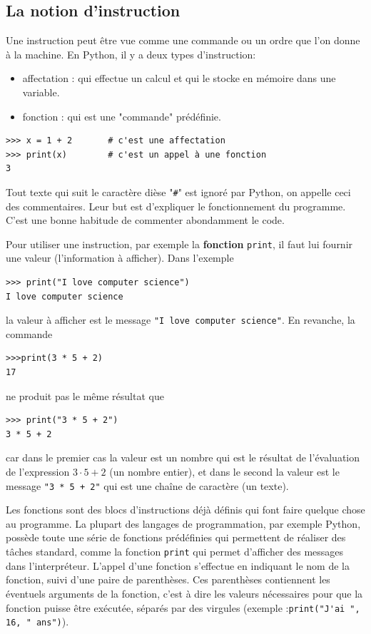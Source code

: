 \documentclass[11pt, a4paper]{book}
\begin{document}
\subsection{La notion d'instruction}
Une instruction peut être vue comme une commande ou un ordre que l'on donne à la machine. En Python, il y a deux types d’instruction:
\begin{itemize}
	\item affectation : qui effectue un calcul et qui le stocke en mémoire dans une variable.
	\item fonction    : qui est une "commande" prédéfinie. 
\end{itemize}
\begin{myexample}
	\vspace{-3mm}
	\begin{lstlisting}[numbers=none]
>>> x = 1 + 2       # c'est une affectation
>>> print(x)        # c'est un appel à une fonction
3
	\end{lstlisting}
	\vspace{-3mm}
\end{myexample}


\begin{eclairage}
	Tout texte qui suit le caractère dièse "\lstinline{#}" est ignoré par Python, on appelle ceci des commentaires. Leur but est d’expliquer le fonctionnement du programme. C’est une bonne habitude de commenter abondamment le code.
\end{eclairage}
Pour utiliser une instruction, par exemple la \textbf{fonction} \lstinline{print}, il faut lui fournir une valeur (l'information à afficher). Dans l'exemple
\begin{lstlisting}[numbers=none]
>>> print("I love computer science")
I love computer science
\end{lstlisting}
la valeur à afficher est le message \lstinline{"I love computer science"}. En revanche, la commande 
\begin{lstlisting}[numbers=none]
>>>print(3 * 5 + 2)
17
\end{lstlisting}
ne produit pas le même résultat que 
\begin{lstlisting}[numbers=none]
>>> print("3 * 5 + 2")
3 * 5 + 2
\end{lstlisting}
car dans le premier cas la valeur est un nombre qui est le résultat de l'évaluation de l'expression $3\cdot 5 +2$ (un nombre entier), et dans le second la valeur est le message \lstinline{"3 * 5 + 2"} qui est une chaîne de caractère (un texte).
\begin{eclairage}
	Les fonctions sont des blocs d'instructions déjà définis qui font faire quelque chose au programme. La plupart des langages de programmation, par exemple Python, possède toute une série de fonctions prédéfinies qui permettent de réaliser des tâches standard, comme la fonction \lstinline{print} qui permet d'afficher des messages dans l'interpréteur. L'appel d'une fonction s'effectue en indiquant le nom	de la fonction, suivi d'une paire de parenthèses. Ces parenthèses contiennent les éventuels arguments de la fonction, c'est à dire les valeurs nécessaires pour que la fonction puisse être exécutée, séparés par des virgules (exemple :\lstinline{print("J'ai ", 16, " ans")}).
\end{eclairage}
\end{document}
